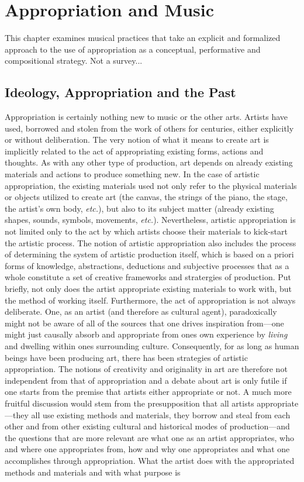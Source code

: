\hypertarget{chapter5}{}
\chapter{Appropriation and Music}

This chapter examines musical practices that take an explicit and formalized approach to the use of appropriation as a conceptual, performative and compositional strategy.
Not a survey...

\section{Ideology, Appropriation and the Past}

Appropriation is certainly nothing new to music or the other arts. Artists have used, borrowed and stolen from the work of others for centuries, either explicitly or without deliberation. The very notion of what it means to create art is implicitly related to the act of appropriating existing forms, actions and thoughts. As with any other type of production, art depends on already existing materials and actions to produce something new. In the case of artistic appropriation, the existing materials used not only refer to the physical materials or objects utilized to create art (the canvas, the strings of the piano, the stage, the artist's own body, \emph{etc.}), but also to its subject matter (already existing shapes, sounds, symbols, movements, \emph{etc.}). Nevertheless, artistic appropriation is not limited only to the act by which artists choose their materials to kick-start the artistic process. The notion of artistic appropriation also includes the process of determining the system of artistic production itself, which is based on a priori forms of knowledge, abstractions, deductions and subjective processes that as a whole constitute a set of creative frameworks and stratergies of production. Put briefly, not only does the artist appropriate existing materials to work with, but the method of working itself. Furthermore, the act of appropriation is not always deliberate. One, as an artist (and therefore as cultural agent), paradoxically might not be aware of all of the sources that one drives inspiration from---one might just causally absorb and appropriate from ones own experience by \emph{living} and dwelling within ones surrounding culture. Consequently, for as long as human beings have been producing art, there has been strategies of artistic appropriation. The notions of creativity and originality in art are therefore not independent from that of appropriation and a debate about art is only futile if one starts from the premise that artists either appropriate or not. A much more fruitful discussion would stem from the presupposition that all artists appropriate---they all use existing methods and materials, they borrow and steal from each other and from other existing cultural and historical modes of production---and the questions that are more relevant are what one as an artist appropriates, who and where one appropriates from, how and why one appropriates and what one accomplishes through appropriation. What the artist does with the appropriated methods and materials and with what purpose is 